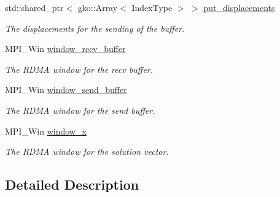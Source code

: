 \begin{DoxyCompactItemize}
\mbox{\label{structschwz_1_1Communicate_1_1comm__struct_a2fe947bc26944406e6e86e1fe1cd4da6}} 
std\+::shared\+\_\+ptr$<$ gko\+::\+Array$<$ Index\+Type $>$ $>$ \hyperlink{structschwz_1_1Communicate_1_1comm__struct_a2fe947bc26944406e6e86e1fe1cd4da6}{put\+\_\+displacements}
\begin{DoxyCompactList}\small\item\em The displacements for the sending of the buffer. \end{DoxyCompactList}\item 
\mbox{\label{structschwz_1_1Communicate_1_1comm__struct_ac68bd596b6afd0621ae0489f0eeda036}} 
M\+P\+I\+\_\+\+Win \hyperlink{structschwz_1_1Communicate_1_1comm__struct_ac68bd596b6afd0621ae0489f0eeda036}{window\+\_\+recv\+\_\+buffer}
\begin{DoxyCompactList}\small\item\em The R\+D\+MA window for the recv buffer. \end{DoxyCompactList}\item 
\mbox{\label{structschwz_1_1Communicate_1_1comm__struct_a7f855fe1b4cb9ceb404b7ca65636aaf3}} 
M\+P\+I\+\_\+\+Win \hyperlink{structschwz_1_1Communicate_1_1comm__struct_a7f855fe1b4cb9ceb404b7ca65636aaf3}{window\+\_\+send\+\_\+buffer}
\begin{DoxyCompactList}\small\item\em The R\+D\+MA window for the send buffer. \end{DoxyCompactList}\item 
\mbox{\label{structschwz_1_1Communicate_1_1comm__struct_ac5600fbbd9b89f3d496e35ab09f28dd0}} 
M\+P\+I\+\_\+\+Win \hyperlink{structschwz_1_1Communicate_1_1comm__struct_ac5600fbbd9b89f3d496e35ab09f28dd0}{window\+\_\+x}
\begin{DoxyCompactList}\small\item\em The R\+D\+MA window for the solution vector. \end{DoxyCompactList}\end{DoxyCompactItemize}


\subsection{Detailed Description}
